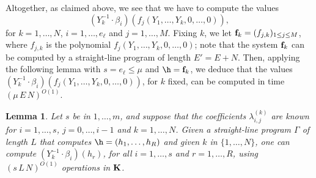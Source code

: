 \documentclass[12pt]{article}
\newtheorem{lemma}[definition]{Lemma}
\begin{document}
Altogether, as claimed above, we see that we have to compute the
values
$$(Y_k^{-1} \cdot \beta_i)(f_j(Y_1,\dots,Y_k,0,\dots,0)),$$ for
$k=1,\dots,N$, $i=1,\dots,e_\ell$ and $j=1,\dots,M$.  Fixing $k$, we
let $\mathbf{f}_k = (f_{j,k})_{1 \le j \le M}$, where $f_{j,k}$ is the
polynomial $f_j(Y_1,\dots,Y_k,0,\dots,0)$; note that the system $\mathbf{f}_k$
can be computed by a straight-line program of length $E'=E+N$. Then,
applying the following lemma with $s=e_\ell \le \mu$ and $\h = \f_k$,
we deduce that the values $(Y_k^{-1} \cdot
\beta_i)(f_j(Y_1,\dots,Y_k,0,\dots,0))$, for $k$ fixed, can be
computed in time $(\mu\,E\,N)^{O(1)}$.


\begin{lemma}
  Let $s$ be in $1,\dots,m$, and suppose that the coefficients
  $\lambda^{(k)}_{i,j}$ are known for $i=1,\dots,s$, $j=0,\dots,i-1$
  and $k=1,\dots,N$. Given a straight-line program $\Gamma$ of length
  $L$ that computes $\h=(h_1,\dots,h_R)$ and given $k$ in
  $\{1,\dots,N\}$, one can compute $(Y_k^{-1}\cdot \beta_i)(h_r)$, for
  all $i=1,\dots,s$ and $r=1,\dots,R$, using $(s\,L\,N)^{O(1)}$
  operations in $\mathbf{K}$.
\end{lemma}
\end{document}
